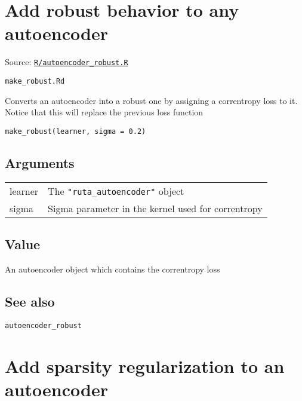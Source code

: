\section{Add robust behavior to any
autoencoder}\label{add-robust-behavior-to-any-autoencoder}

Source:
\href{https://github.com/fdavidcl/ruta/blob/master/R/autoencoder_robust.R}{\texttt{R/autoencoder\_robust.R}}

\texttt{make\_robust.Rd}

Converts an autoencoder into a robust one by assigning a correntropy
loss to it. Notice that this will replace the previous loss function

\begin{verbatim}
make_robust(learner, sigma = 0.2)
\end{verbatim}

\hypertarget{arguments}{\subsection{\texorpdfstring{\protect\hyperlink{arguments}{}Arguments}{Arguments}}\label{arguments}}

\begin{longtable}[c]{@{}ll@{}}
\toprule
learner & The \texttt{"ruta\_autoencoder"} object\tabularnewline
sigma & Sigma parameter in the kernel used for
correntropy\tabularnewline
\bottomrule
\end{longtable}

\hypertarget{value}{\subsection{\texorpdfstring{\protect\hyperlink{value}{}Value}{Value}}\label{value}}

An autoencoder object which contains the correntropy loss

\hypertarget{see-also}{\subsection{\texorpdfstring{\protect\hyperlink{see-also}{}See
also}{See also}}\label{see-also}}

\texttt{autoencoder\_robust}

\section{Add sparsity regularization to an
autoencoder}\label{add-sparsity-regularization-to-an-autoencoder}

